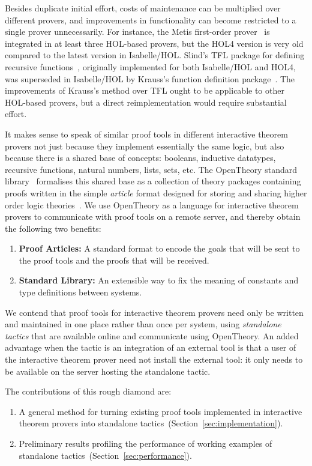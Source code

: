 \documentclass{llncs}
\newcommand{\OpenTheory}{OpenTheory\xspace}
\newcommand{\secref}[1]{Section~\ref{sec:#1}}
\begin{document}
Besides duplicate initial effort, costs of maintenance can be multiplied over different provers, and improvements in functionality can become restricted to a single prover unnecessarily.
For instance, the Metis first-order prover~\cite{hurd2003d} is integrated in at least three HOL-based provers, but the HOL4 version is very old compared to the latest version in Isabelle/HOL.
Slind's TFL package for defining recursive functions~\cite{slindphd}, originally implemented for both Isabelle/HOL and HOL4, was superseded in Isabelle/HOL by Krauss's function definition package~\cite{DBLP:journals/jar/Krauss10}.
The improvements of Krauss's method over TFL ought to be applicable to other HOL-based provers, but a direct reimplementation would require substantial effort.

It makes sense to speak of similar proof tools in different interactive theorem provers not just because they implement essentially the same logic, but also because there is a shared base of concepts: booleans, inductive datatypes, recursive functions, natural numbers, lists, sets, etc.
The \OpenTheory standard library~\cite{hurd2011} formalises this shared base as a collection of theory packages containing proofs written in the simple \emph{article} format designed for storing and sharing higher order logic theories~\cite{hurd2009}.
We use \OpenTheory as a language for interactive theorem provers to communicate with proof tools on a remote server, and thereby obtain the following two benefits:
\begin{enumerate}
\item\textbf{Proof Articles:} A standard format to encode the goals that will be sent to the proof tools and the proofs that will be received.

\item\textbf{Standard Library:} An extensible way to fix the meaning of constants and type definitions between systems.
\end{enumerate}

We contend that proof tools for interactive theorem provers need only be written and maintained in one place rather than once per system, using \emph{standalone tactics} that are available online and communicate using \OpenTheory.
An added advantage when the tactic is an integration of an external tool is that a user of the interactive theorem prover need not install the external tool: it only needs to be available on the server hosting the standalone tactic.

The contributions of this rough diamond are:
\begin{enumerate}
\item A general method for turning existing proof tools implemented in interactive theorem provers into standalone tactics~(\secref{implementation}).

\item Preliminary results profiling the performance of working examples of standalone tactics~(\secref{performance}).
\end{enumerate}
\end{document}
